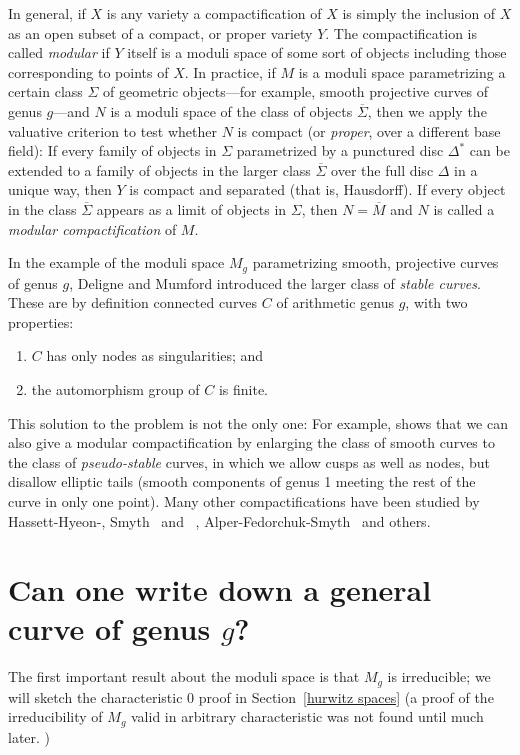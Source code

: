 In general, if $X$ is any variety a compactification of $X$ is simply the inclusion of $X$ as an open subset of a compact, or proper variety $Y$. The compactification is called \emph{modular} if $Y$ itself is a moduli space of some sort of objects including those corresponding to points of $X$. In practice, if $M$ is a moduli space parametrizing a certain class $\Sigma$ of geometric objects---for example, smooth projective curves of genus $g$---and $N$ is a moduli space of the class of objects $\overline \Sigma$, then we apply the valuative criterion to test whether $N$ is compact (or \emph{proper}, over a different base field): If every family of objects in $\Sigma$ parametrized by a punctured disc $\Delta^*$ can be extended to a family of objects in the larger class $\overline \Sigma$ over the full disc $\Delta$ in a unique way, then $Y$ is compact and separated (that is, Hausdorff). If every object in the class $\overline \Sigma$ appears as a limit of objects in $\Sigma$, then $N = \overline M$ and $N$ is called a \emph{modular compactification} of $M$.

In the example of the moduli space $M_g$ parametrizing smooth, projective curves of genus $g$, Deligne and Mumford introduced the larger class of \emph{stable curves}. These are by definition connected curves $C$ of arithmetic genus $g$, with two properties:

\begin{enumerate}
\item $C$ has only nodes as singularities; and
\item the automorphism group of $C$ is finite.
\end{enumerate}

This  solution to the problem is not the only one: For example, \cite{MR1106299} shows that we can also give a modular compactification by enlarging the class of smooth curves to the class of \emph{pseudo-stable} curves, in which we allow cusps as well as nodes, but disallow elliptic tails (smooth components of genus 1 meeting the rest of the curve in only one point). Many other compactifications have been studied by Hassett-Hyeon-\cite{MR2500894}, Smyth~\cite{MR2801404} and ~\cite{MR3044128}, Alper-Fedorchuk-Smyth~\cite{MR3020172} and others.

\section{Can one write down a general curve of genus $g$?}

The first important result about the moduli space is that $M_g$ is irreducible; we will sketch the characteristic 0 proof in Section~\ref{hurwitz spaces}  (a proof of the irreducibility of $M_g$ valid in arbitrary characteristic was not found until much later. )

